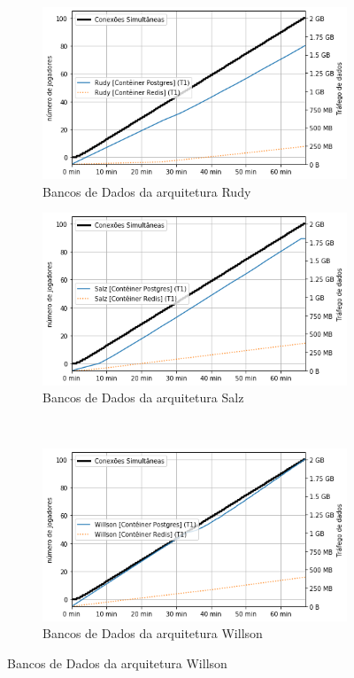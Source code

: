 \begin{figure}[htb!]
    \caption{Entrada de dados da rede dos bancos de dados}
    \label{fig:experimento_db_net_in}

    \begin{subfigure}{0.5\textwidth}
        \centering
        \includegraphics[width=.95\linewidth]{figuras/analise/rt/r_net_in_db.png}
        \caption{Bancos de Dados da arquitetura Rudy}
        \label{fig:r_netin_db}
    \end{subfigure}%
    \begin{subfigure}{0.5\textwidth}
        \centering
        \includegraphics[width=.95\linewidth]{figuras/analise/rt/s_net_in_db.png}
        \caption{Bancos de Dados da arquitetura Salz}
        \label{fig:s_netin_db}
    \end{subfigure}\\

    \begin{subfigure}{0.5\textwidth}
        \centering
        \includegraphics[width=.95\linewidth]{figuras/analise/rt/w_net_in_db.png}
        \caption{Bancos de Dados da arquitetura Willson}
        \label{fig:w_netin_db}
    \end{subfigure}


\end{figure}
